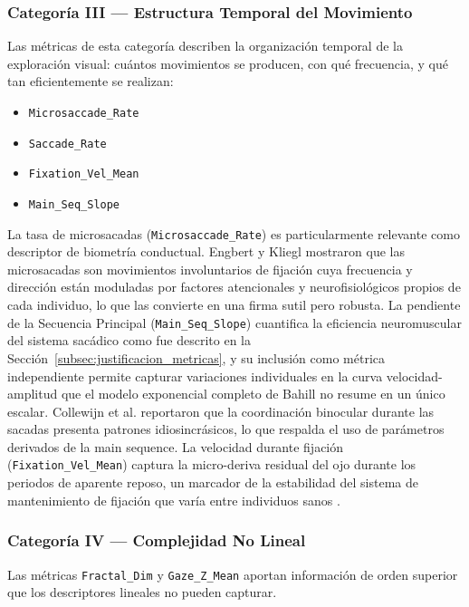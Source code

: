 \subsubsection*{Categoría III — Estructura Temporal del Movimiento}

Las métricas de esta categoría describen la organización temporal de la exploración visual: cuántos movimientos se producen, con qué frecuencia, y qué tan eficientemente se realizan:

\begin{itemize}
	\item \texttt{Microsaccade\_Rate}
	\item \texttt{Saccade\_Rate}
	\item \texttt{Fixation\_Vel\_Mean}
	\item \texttt{Main\_Seq\_Slope}
\end{itemize}

La tasa de microsacadas (\texttt{Microsaccade\_Rate}) es particularmente relevante como descriptor de biometría conductual. Engbert y Kliegl \cite{engbert2003microsaccades} mostraron que las microsacadas son movimientos involuntarios de fijación cuya frecuencia y dirección están moduladas por factores atencionales y neurofisiológicos propios de cada individuo, lo que las convierte en una firma sutil pero robusta. La pendiente de la Secuencia Principal (\texttt{Main\_Seq\_Slope}) cuantifica la eficiencia neuromuscular del sistema sacádico como fue descrito en la Sección~\ref{subsec:justificacion_metricas}, y su inclusión como métrica independiente permite capturar variaciones individuales en la curva velocidad-amplitud que el modelo exponencial completo de Bahill \cite{bahill1975} no resume en un único escalar. Collewijn et al. \cite{collewijn1988binocular} reportaron que la coordinación binocular durante las sacadas presenta patrones idiosincrásicos, lo que respalda el uso de parámetros derivados de la main sequence. La velocidad durante fijación (\texttt{Fixation\_Vel\_Mean}) captura la micro-deriva residual del ojo durante los periodos de aparente reposo, un marcador de la estabilidad del sistema de mantenimiento de fijación que varía entre individuos sanos \cite{leigh2015neurology}.

\subsubsection*{Categoría IV — Complejidad No Lineal}

Las métricas \texttt{Fractal\_Dim} y \texttt{Gaze\_Z\_Mean} aportan información de orden superior que los descriptores lineales no pueden capturar.

